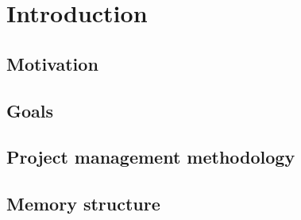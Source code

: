 \chapter{Introduction}
\label{cap:introduction}

\section{Motivation}
\label{sec:motivation}

\section{Goals}
\label{sec:goals}

\section{Project management methodology}
\label{sec:project_management}

\section{Memory structure}
\label{sec:memory_structure}












